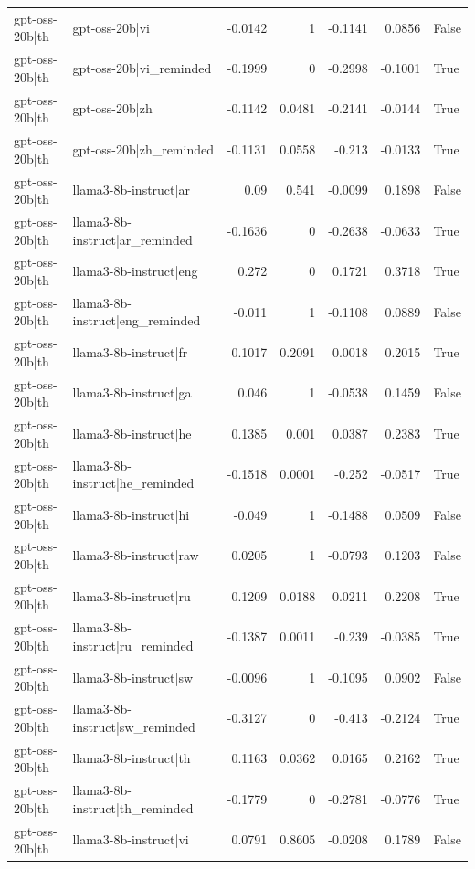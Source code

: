 \begin{table}
\begin{tabular}{l l r r r r l}
gpt-oss-20b|th & gpt-oss-20b|vi & -0.0142 & 1 & -0.1141 & 0.0856 & False \\
gpt-oss-20b|th & gpt-oss-20b|vi_reminded & -0.1999 & 0 & -0.2998 & -0.1001 & True \\
gpt-oss-20b|th & gpt-oss-20b|zh & -0.1142 & 0.0481 & -0.2141 & -0.0144 & True \\
gpt-oss-20b|th & gpt-oss-20b|zh_reminded & -0.1131 & 0.0558 & -0.213 & -0.0133 & True \\
gpt-oss-20b|th & llama3-8b-instruct|ar & 0.09 & 0.541 & -0.0099 & 0.1898 & False \\
gpt-oss-20b|th & llama3-8b-instruct|ar_reminded & -0.1636 & 0 & -0.2638 & -0.0633 & True \\
gpt-oss-20b|th & llama3-8b-instruct|eng & 0.272 & 0 & 0.1721 & 0.3718 & True \\
gpt-oss-20b|th & llama3-8b-instruct|eng_reminded & -0.011 & 1 & -0.1108 & 0.0889 & False \\
gpt-oss-20b|th & llama3-8b-instruct|fr & 0.1017 & 0.2091 & 0.0018 & 0.2015 & True \\
gpt-oss-20b|th & llama3-8b-instruct|ga & 0.046 & 1 & -0.0538 & 0.1459 & False \\
gpt-oss-20b|th & llama3-8b-instruct|he & 0.1385 & 0.001 & 0.0387 & 0.2383 & True \\
gpt-oss-20b|th & llama3-8b-instruct|he_reminded & -0.1518 & 0.0001 & -0.252 & -0.0517 & True \\
gpt-oss-20b|th & llama3-8b-instruct|hi & -0.049 & 1 & -0.1488 & 0.0509 & False \\
gpt-oss-20b|th & llama3-8b-instruct|raw & 0.0205 & 1 & -0.0793 & 0.1203 & False \\
gpt-oss-20b|th & llama3-8b-instruct|ru & 0.1209 & 0.0188 & 0.0211 & 0.2208 & True \\
gpt-oss-20b|th & llama3-8b-instruct|ru_reminded & -0.1387 & 0.0011 & -0.239 & -0.0385 & True \\
gpt-oss-20b|th & llama3-8b-instruct|sw & -0.0096 & 1 & -0.1095 & 0.0902 & False \\
gpt-oss-20b|th & llama3-8b-instruct|sw_reminded & -0.3127 & 0 & -0.413 & -0.2124 & True \\
gpt-oss-20b|th & llama3-8b-instruct|th & 0.1163 & 0.0362 & 0.0165 & 0.2162 & True \\
gpt-oss-20b|th & llama3-8b-instruct|th_reminded & -0.1779 & 0 & -0.2781 & -0.0776 & True \\
gpt-oss-20b|th & llama3-8b-instruct|vi & 0.0791 & 0.8605 & -0.0208 & 0.1789 & False \\

\end{tabular}
\end{table}
